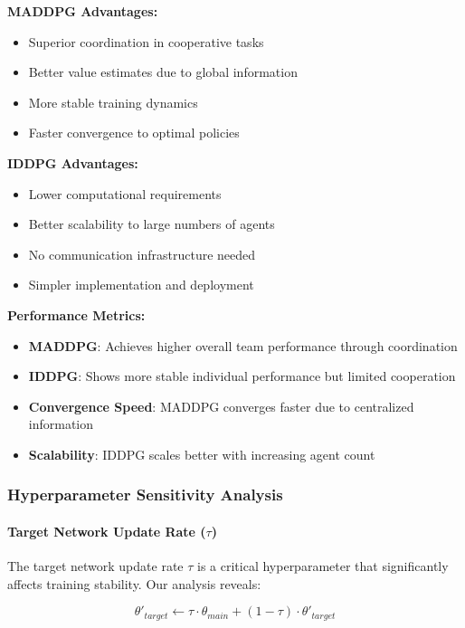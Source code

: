 \documentclass[conference]{IEEEtran}
\begin{document}
{{\textbf{MADDPG Advantages:}
\begin{itemize}
    \item Superior coordination in cooperative tasks
    \item Better value estimates due to global information
    \item More stable training dynamics
    \item Faster convergence to optimal policies
\end{itemize}

\textbf{IDDPG Advantages:}
\begin{itemize}
    \item Lower computational requirements
    \item Better scalability to large numbers of agents
    \item No communication infrastructure needed
    \item Simpler implementation and deployment
\end{itemize}

\textbf{Performance Metrics:}
\begin{itemize}
    \item \textbf{MADDPG}: Achieves higher overall team performance through coordination
    \item \textbf{IDDPG}: Shows more stable individual performance but limited cooperation
    \item \textbf{Convergence Speed}: MADDPG converges faster due to centralized information
    \item \textbf{Scalability}: IDDPG scales better with increasing agent count
\end{itemize}

\subsubsection{Hyperparameter Sensitivity Analysis}

\paragraph{Target Network Update Rate ($\tau$)}

The target network update rate $\tau$ is a critical hyperparameter that significantly affects training stability. Our analysis reveals:

\begin{equation}
\theta'_{target} \leftarrow \tau \cdot \theta_{main} + (1-\tau) \cdot \theta'_{target}
\end{equation}

}}
\end{document}
